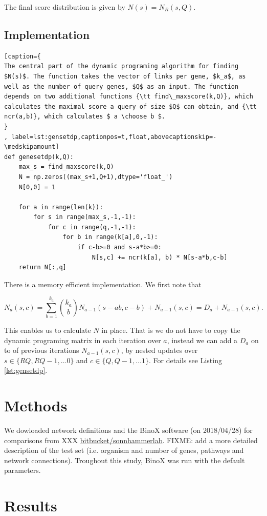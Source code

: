 \documentclass[a4paper,american]{lipics-v2016}
\begin{document}
The final score distribution is given by $N(s)=N_R(s,Q)$.

\subsection*{Implementation}

\begin{lstlisting}[caption={
The central part of the dynamic programing algorithm for finding $N(s)$. The function takes the vector of links per gene, $k_a$, as well as the number of query genes, $Q$ as an input. The function depends on two additional functions {\tt find\_maxscore(k,Q)}, which calculates the maximal score a query of size $Q$ can obtain, and {\tt ncr(a,b)}, which calculates $ a \choose b $.
}
, label=lst:gensetdp,captionpos=t,float,abovecaptionskip=-\medskipamount]
def genesetdp(k,Q):
    max_s = find_maxscore(k,Q)
    N = np.zeros((max_s+1,Q+1),dtype='float_')
    N[0,0] = 1

    for a in range(len(k)):
        for s in range(max_s,-1,-1):
            for c in range(q,-1,-1):
                for b in range(k[a],0,-1):
                    if c-b>=0 and s-a*b>=0:
                        N[s,c] += ncr(k[a], b) * N[s-a*b,c-b]
    return N[:,q]
\end{lstlisting}
There is a memory efficient implementation. We first note that

\[
N_a(s,c)=\sum_{b=1}^{k_a}{k_a \choose b} N_{a-1}(s-ab,c-b) + N_{a-1}(s,c)=D_a+N_{a-1}(s,c).
\]


This enables us to calculate $N$ in place. That is we do not have to copy the dynamic programing matrix in each iteration over $a$,
instead we can add a $D_a$ on to of previous iterations $N_{a-1}(s,c)$, by nested updates over $s \in \{ RQ, RQ-1, \ldots 0 \}$ and $c \in \{ Q, Q-1, \ldots 1 \}$. For details see Listing \ref{lst:gensetdp}.

\section*{Methods}

We dowloaded network definitions and the BinoX software (on 2018/04/28) for comparisons from XXX \url{bitbucket/sonnhammerlab}. FIXME: add a more detailed description of the test set (i.e. organism and number of genes, pathways and network connections).
Troughout this study, BinoX was run with the default parameters.
\section*{Results}
\end{document}
